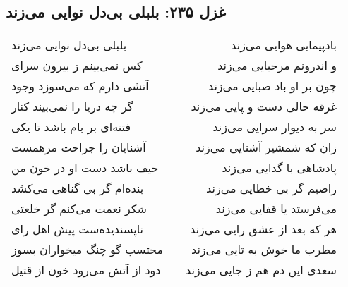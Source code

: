 \begin{center}
\section*{غزل ۲۳۵: بلبلی بی‌دل نوایی می‌زند}
\label{sec:235}
\begin{longtable}{l p{0.5cm} r}
بلبلی بی‌دل نوایی می‌زند
&&
بادپیمایی هوایی می‌زند
\\
کس نمی‌بینم ز بیرون سرای
&&
و اندرونم مرحبایی می‌زند
\\
آتشی دارم که می‌سوزد وجود
&&
چون بر او باد صبایی می‌زند
\\
گر چه دریا را نمی‌بیند کنار
&&
غرقه حالی دست و پایی می‌زند
\\
فتنه‌ای بر بام باشد تا یکی
&&
سر به دیوار سرایی می‌زند
\\
آشنایان را جراحت مرهمست
&&
زان که شمشیر آشنایی می‌زند
\\
حیف باشد دست او در خون من
&&
پادشاهی با گدایی می‌زند
\\
بنده‌ام گر بی گناهی می‌کشد
&&
راضیم گر بی خطایی می‌زند
\\
شکر نعمت می‌کنم گر خلعتی
&&
می‌فرستد یا قفایی می‌زند
\\
ناپسندیده‌ست پیش اهل رای
&&
هر که بعد از عشق رایی می‌زند
\\
محتسب گو چنگ میخواران بسوز
&&
مطرب ما خوش به تایی می‌زند
\\
دود از آتش می‌رود خون از قتیل
&&
سعدی این دم هم ز جایی می‌زند
\\
\end{longtable}
\end{center}

